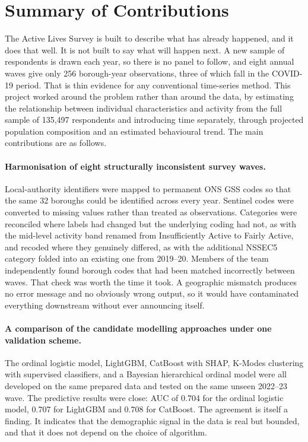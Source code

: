 \documentclass[ %
                    author={Ashrey Ashrey, Sanya Kapoor, Trisha Sharma, Yash Bhooshan Pandloskar},
                supervisor={Dr. Dalila O’Grady},
                    degree={MSc},
                     title={Using machine learning to forecast physical activity participation, volunteering and activity patterns in London},
                  subtitle={},
                      type={},
                      year={2021}]{dissertation}
\begin{document}
\section{Summary of Contributions}

The Active Lives Survey is built to describe what has already happened, and it does that well. It is not built to say what will happen next. A new sample of respondents is drawn each year, so there is no panel to follow, and eight annual waves give only 256 borough-year observations, three of which fall in the COVID-19 period. That is thin evidence for any conventional time-series method. This project worked around the problem rather than around the data, by estimating the relationship between individual characteristics and activity from the full sample of 135{,}497 respondents and introducing time separately, through projected population composition and an estimated behavioural trend.
The main contributions are as follows.

\paragraph{Harmonisation of eight structurally inconsistent survey waves.}
Local-authority identifiers were mapped to permanent ONS GSS codes so that the same 32 boroughs could be identified across every year. Sentinel codes were converted to missing values rather than treated as observations. Categories were reconciled where labels had changed but the underlying coding had not, as with the mid-level activity band renamed from Insufficiently Active to Fairly Active, and recoded where they genuinely differed, as with the additional NSSEC5 category folded into an existing one from 2019--20. Members of the team independently found borough codes that had been matched incorrectly between waves. That check was worth the time it took. A geographic mismatch produces no error message and no obviously wrong output, so it would have contaminated everything downstream
without ever announcing itself.

\paragraph{A comparison of the candidate modelling approaches under one
validation scheme.}
The ordinal logistic model, LightGBM, CatBoost with SHAP, K-Modes clustering with supervised classifiers, and a Bayesian hierarchical ordinal model were all developed on the same prepared data and tested on the same unseen 2022--23 wave. The predictive results were close: AUC of 0.704 for the ordinal logistic model, 0.707 for LightGBM and 0.708 for CatBoost. The agreement is itself a finding. It indicates that the demographic signal in the data is real but bounded, and that
it does not depend on the choice of algorithm.
\end{document}
